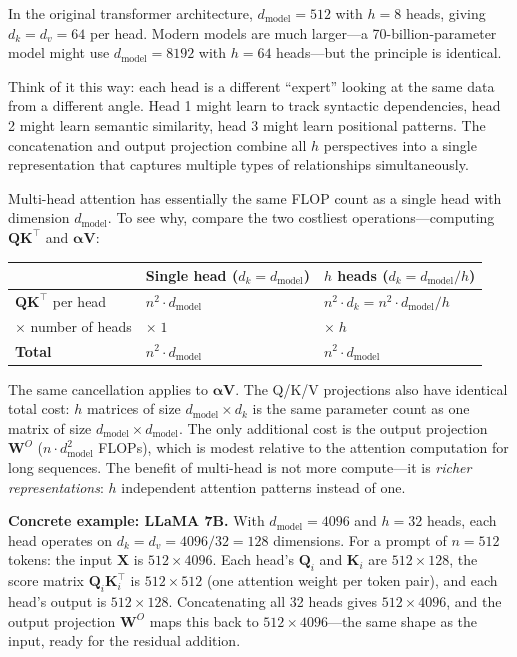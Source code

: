 In the original transformer architecture, $d_{\text{model}} = 512$ with $h = 8$ heads, giving $d_k = d_v = 64$ per head. Modern models are much larger---a 70-billion-parameter model might use $d_{\text{model}} = 8192$ with $h = 64$ heads---but the principle is identical.

Think of it this way: each head is a different ``expert'' looking at the same data from a different angle. Head 1 might learn to track syntactic dependencies, head 2 might learn semantic similarity, head 3 might learn positional patterns. The concatenation and output projection combine all $h$ perspectives into a single representation that captures multiple types of relationships simultaneously.

\begin{insightbox}
Multi-head attention has essentially the same FLOP count as a single head with dimension $d_{\text{model}}$. To see why, compare the two costliest operations---computing $\mathbf{Q}\mathbf{K}^\top$ and $\boldsymbol{\alpha}\mathbf{V}$:

\begin{center}
\begin{tabular}{lll}
\toprule
 & \textbf{Single head} ($d_k = d_{\text{model}}$) & $h$ \textbf{heads} ($d_k = d_{\text{model}}/h$) \\
\midrule
$\mathbf{Q}\mathbf{K}^\top$ per head & $n^2 \cdot d_{\text{model}}$ & $n^2 \cdot d_k = n^2 \cdot d_{\text{model}}/h$ \\
$\times$ number of heads & $\times\; 1$ & $\times\; h$ \\
\textbf{Total} & $n^2 \cdot d_{\text{model}}$ & $n^2 \cdot d_{\text{model}}$ \\
\bottomrule
\end{tabular}
\end{center}

The same cancellation applies to $\boldsymbol{\alpha}\mathbf{V}$. The Q/K/V projections also have identical total cost: $h$ matrices of size $d_{\text{model}} \times d_k$ is the same parameter count as one matrix of size $d_{\text{model}} \times d_{\text{model}}$. The only additional cost is the output projection $\mathbf{W}^O$ ($n \cdot d_{\text{model}}^2$ FLOPs), which is modest relative to the attention computation for long sequences. The benefit of multi-head is not more compute---it is \emph{richer representations}: $h$ independent attention patterns instead of one.
\end{insightbox}

\textbf{Concrete example: LLaMA 7B.}\hspace{1em} With $d_{\text{model}} = 4096$ and $h = 32$ heads, each head operates on $d_k = d_v = 4096/32 = 128$ dimensions. For a prompt of $n = 512$ tokens: the input $\mathbf{X}$ is $512 \times 4096$. Each head's $\mathbf{Q}_i$ and $\mathbf{K}_i$ are $512 \times 128$, the score matrix $\mathbf{Q}_i \mathbf{K}_i^\top$ is $512 \times 512$ (one attention weight per token pair), and each head's output is $512 \times 128$. Concatenating all 32 heads gives $512 \times 4096$, and the output projection $\mathbf{W}^O$ maps this back to $512 \times 4096$---the same shape as the input, ready for the residual addition.


